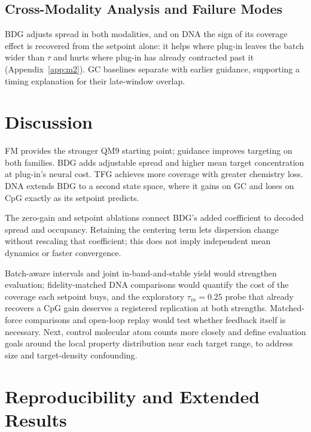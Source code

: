 \documentclass{article}
\begin{document}
\subsection{Cross-Modality Analysis and Failure Modes}\label{sec:failure}
BDG adjusts spread in both modalities, and on DNA the sign of its coverage effect is recovered from the setpoint alone: it helps where plug-in leaves the batch wider than $\tau$ and hurts where plug-in has already contracted past it (Appendix~\ref{app:m2}). GC baselines separate with earlier guidance, supporting a timing explanation for their late-window overlap.

\section{Discussion}
FM provides the stronger QM9 starting point; guidance improves targeting on both families. BDG adds adjustable spread and higher mean target concentration at plug-in's neural cost. TFG achieves more coverage with greater chemistry loss. DNA extends BDG to a second state space, where it gains on GC and loses on CpG exactly as its setpoint predicts.

The zero-gain and setpoint ablations connect BDG's added coefficient to decoded spread and occupancy. Retaining the centering term lets dispersion change without rescaling that coefficient; this does not imply independent mean dynamics or faster convergence.

Batch-aware intervals and joint in-band-and-stable yield would strengthen evaluation; fidelity-matched DNA comparisons would quantify the cost of the coverage each setpoint buys, and the exploratory $\tau_m=0.25$ probe that already recovers a CpG gain deserves a registered replication at both strengths. Matched-force comparisons and open-loop replay would test whether feedback itself is necessary. Next, control molecular atom counts more closely and define evaluation goals around the local property distribution near each target range, to address size and target-density confounding.
\clearpage


\clearpage
\appendix
\renewcommand{\thetable}{S\arabic{table}}
\renewcommand{\theHtable}{S\arabic{table}}
\setcounter{table}{0}
\renewcommand{\thefigure}{S\arabic{figure}}
\renewcommand{\theHfigure}{S\arabic{figure}}
\setcounter{figure}{0}
\section{Reproducibility and Extended Results}
\end{document}
